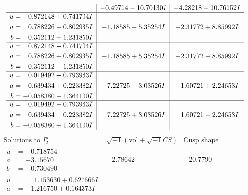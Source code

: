 \documentclass[1p]{elsarticle_modified}
\theoremstyle{definition}
\newcommand{\I}{\sqrt{-1}}
\begin{document}
$$\begin{array}{c|c|c}
 & -0.49714 - 10.70130 I & -4.28218 + 10.76152 I \\ \hline\begin{aligned}
u &= \phantom{-}0.872148 + 0.741704 I \\
a &= \phantom{-}0.788226 - 0.802935 I \\
b &= \phantom{-}0.352112 + 1.231850 I\end{aligned}
 & -1.18585 - 5.35254 I & -2.31772 + 8.85992 I \\ \hline\begin{aligned}
u &= \phantom{-}0.872148 - 0.741704 I \\
a &= \phantom{-}0.788226 + 0.802935 I \\
b &= \phantom{-}0.352112 - 1.231850 I\end{aligned}
 & -1.18585 + 5.35254 I & -2.31772 - 8.85992 I \\ \hline\begin{aligned}
u &= \phantom{-}0.019492 + 0.793963 I \\
a &= -0.639434 + 0.223382 I \\
b &= -0.058380 - 1.364100 I\end{aligned}
 & \phantom{-}7.22725 - 3.03526 I & \phantom{-}1.60721 + 2.24653 I \\ \hline\begin{aligned}
u &= \phantom{-}0.019492 - 0.793963 I \\
a &= -0.639434 - 0.223382 I \\
b &= -0.058380 + 1.364100 I\end{aligned}
 & \phantom{-}7.22725 + 3.03526 I & \phantom{-}1.60721 - 2.24653 I\\
 \hline 
 \end{array}$$\newpage$$\begin{array}{c|c|c}  
\text{Solutions to }I^u_{2}& \I (\text{vol} + \sqrt{-1}CS) & \text{Cusp shape}\\
 \hline 
\begin{aligned}
u &= -0.718754\phantom{ +0.000000I} \\
a &= -3.15670\phantom{ +0.000000I} \\
b &= -0.730490\phantom{ +0.000000I}\end{aligned}
 & -2.78642\phantom{ +0.000000I} & -20.7790\phantom{ +0.000000I} \\ \hline\begin{aligned}
u &= \phantom{-}1.153630 + 0.627666 I \\
a &= -1.216750 + 0.164373 I \\

\end{aligned}
\end{array}$$
\end{document}
